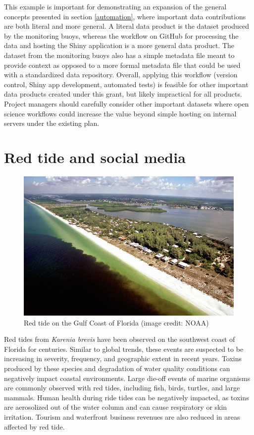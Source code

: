 \documentclass[
]{book}
\begin{document}
This example is important for demonstrating an expansion of the general concepts presented in section \ref{automation}, where important data contributions are both literal and more general. A literal data product is the dataset produced by the monitoring buoys, whereas the workflow on GitHub for processing the data and hosting the Shiny application is a more general data product. The dataset from the monitoring buoys also has a simple metadata file meant to provide context as opposed to a more formal metadata file that could be used with a standardized data repository. Overall, applying this workflow (version control, Shiny app development, automated tests) is feasible for other important data products created under this grant, but likely impractical for all products. Project managers should carefully consider other important datasets where open science workflows could increase the value beyond simple hosting on internal servers under the existing plan.

\section{Red tide and social media}\label{twitter}

\begin{figure}

{\centering \includegraphics[width=0.8\linewidth]{img/red tide} 

}

\caption{Red tide on the Gulf Coast of Florida (image credit: NOAA)}\label{fig:unnamed-chunk-14}
\end{figure}

Red tides from \emph{Karenia brevis} have been observed on the southwest coast of Florida for centuries. Similar to global trends, these events are suspected to be increasing in severity, frequency, and geographic extent in recent years. Toxins produced by these species and degradation of water quality conditions can negatively impact coastal environments. Large die-off events of marine organisms are commonly observed with red tides, including fish, birds, turtles, and large mammals. Human health during ride tides can be negatively impacted, as toxins are aerosolized out of the water column and can cause respiratory or skin irritation. Tourism and waterfront business revenues are also reduced in areas affected by red tide.
\end{document}
